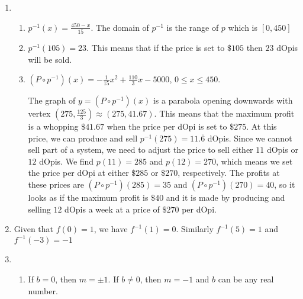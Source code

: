 \documentclass{ximera}
\begin{document}
\enlargethispage{1in}

\begin{enumerate}
\setcounter{enumi}{\value{HW}}


\item  

\begin{enumerate}

\item $p^{-1}(x) = \frac{450-x}{15}$.  The domain of $p^{-1}$ is the range of $p$ which is $[0,450]$

\item  $p^{-1}(105) = 23$. This means that if the price is set to $\$105$ then $23$ dOpis will be sold.

\item $\left(P\circ p^{-1}\right)(x) = -\frac{1}{15} x^2 + \frac{110}{3} x - 5000$, $0 \leq x \leq 450$.  

\smallskip

The graph of $y = \left(P\circ p^{-1}\right)(x)$ is a parabola opening downwards with vertex $\left(275, \frac{125}{3}\right) \approx (275, 41.67)$.  This means that the maximum profit is a whopping $\$41.67$ when the price per dOpi is set to $\$275$.   At this price, we can produce and sell $p^{-1}(275) = 11.\overline{6}$ dOpis.  Since we cannot sell part of a system, we need to adjust the price to sell either $11$ dOpis or $12$ dOpis. We find $p(11) = 285$ and $p(12) = 270$, which means we set the price per dOpi at either $\$285$ or $\$270$, respectively.  The profits at these prices are $\left(P\circ p^{-1}\right)(285) = 35$ and  $\left(P\circ p^{-1}\right)(270) = 40$, so it looks as if the maximum profit is $\$40$ and it is made by producing and selling $12$ dOpis a week at a price of $\$270$ per dOpi.

\end{enumerate}

\addtocounter{enumi}{1}

\item Given that $f(0) = 1$, we have $f^{-1}(1) = 0$.  Similarly $f^{-1}(5) = 1$ and $f^{-1}(-3) = -1$

\addtocounter{enumi}{9}

\item  \begin{enumerate} \addtocounter{enumii}{1} \item If $b =0$, then $m = \pm 1$.  If $b \neq 0$, then $m = -1$ and $b$ can be any real number. \end{enumerate}

\end{enumerate}

\newpage
\end{document}
